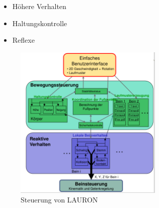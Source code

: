 \begin{itemize}
\item Höhere Verhalten
\item Haltungskontrolle
\item Reflexe
\end{itemize}
\begin{figure}[h!]
	\centering
	\includegraphics[width=0.63\textwidth]{figures/ch05_lauron.png}
	\caption{Steuerung von LAURON}
	\label{lauri}
\end{figure}
